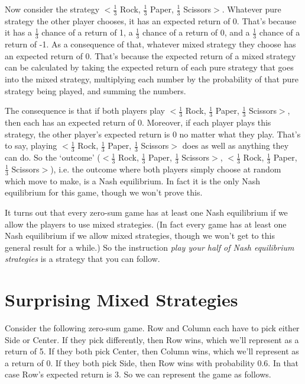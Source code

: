 Now consider the strategy $<$$\frac{1}{3}$ Rock, $\frac{1}{3}$ Paper, $\frac{1}{3}$ Scissors$>$. Whatever pure strategy the other player chooses, it has an expected return of 0. That's because it has a $\frac{1}{3}$ chance of a return of 1, a $\frac{1}{3}$ chance of a return of 0, and a $\frac{1}{3}$ chance of a return of -1. As a consequence of that, whatever mixed strategy they choose has an expected return of 0. That's because the expected return of a mixed strategy can be calculated by taking the expected return of each pure strategy that goes into the mixed strategy, multiplying each number by the probability of that pure strategy being played, and summing the numbers.

The consequence is that if both players play $<$$\frac{1}{3}$ Rock, $\frac{1}{3}$ Paper, $\frac{1}{3}$ Scissors$>$, then each has an expected return of 0. Moreover, if each player plays this strategy, the other player's expected return is 0 no matter what they play. That's to say, playing $<$$\frac{1}{3}$ Rock, $\frac{1}{3}$ Paper, $\frac{1}{3}$ Scissors$>$ does as well as anything they can do. So the `outcome' ($<$$\frac{1}{3}$ Rock, $\frac{1}{3}$ Paper, $\frac{1}{3}$ Scissors$>$, $<$$\frac{1}{3}$ Rock, $\frac{1}{3}$ Paper, $\frac{1}{3}$ Scissors$>$), i.e. the outcome where both players simply choose at random which move to make, is a Nash equilibrium. In fact it is the only Nash equilibrium for this game, though we won't prove this.

It turns out that every zero-sum game has at least one Nash equilibrium if we allow the players to use mixed strategies. (In fact every game has at least one Nash equilibrium if we allow mixed strategies, though we won't get to this general result for a while.) So the instruction \textit{play your half of Nash equilibrium strategies} is a strategy that you can follow.

\section{Surprising Mixed Strategies}
Consider the following zero-sum game. Row and Column each have to pick either Side or Center. If they pick differently, then Row wins, which we'll represent as a return of 5. If they both pick Center, then Column wins, which we'll represent as a return of 0. If they both pick Side, then Row wins with probability 0.6. In that case Row's expected return is 3. So we can represent the game as follows.

